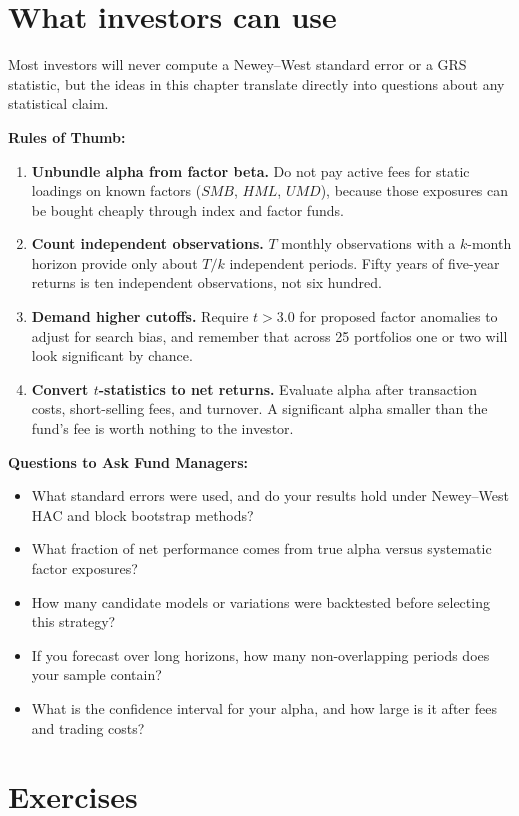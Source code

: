 \section{What investors can use}
\label{sec:03-investors}

Most investors will never compute a Newey--West standard error or a GRS statistic, but the ideas in this chapter translate directly into questions about any statistical claim.

\textbf{Rules of Thumb:}
\begin{enumerate}
  \item \textbf{Unbundle alpha from factor beta.} Do not pay active fees for static loadings on known factors ($SMB$, $HML$, $UMD$), because those exposures can be bought cheaply through index and factor funds.
  \item \textbf{Count independent observations.} $T$ monthly observations with a $k$-month horizon provide only about $T/k$ independent periods. Fifty years of five-year returns is ten independent observations, not six hundred.
  \item \textbf{Demand higher cutoffs.} Require $t > 3.0$ for proposed factor anomalies to adjust for search bias, and remember that across 25 portfolios one or two will look significant by chance.
  \item \textbf{Convert $t$-statistics to net returns.} Evaluate alpha after transaction costs, short-selling fees, and turnover. A significant alpha smaller than the fund's fee is worth nothing to the investor.
\end{enumerate}

\textbf{Questions to Ask Fund Managers:}
\begin{itemize}
  \item What standard errors were used, and do your results hold under Newey--West HAC and block bootstrap methods?
  \item What fraction of net performance comes from true alpha versus systematic factor exposures?
  \item How many candidate models or variations were backtested before selecting this strategy?
  \item If you forecast over long horizons, how many non-overlapping periods does your sample contain?
  \item What is the confidence interval for your alpha, and how large is it after fees and trading costs?
\end{itemize}

\section*{Exercises}

